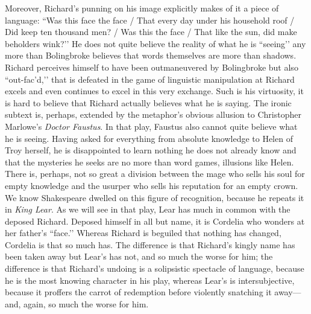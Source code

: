 Moreover, Richard’s punning on his image explicitly makes of it a piece of language: ``Was this face the face / That every day under his household roof / Did keep ten thousand men? / Was this the face / That like the sun, did make beholders wink?’’ He does not quite believe the reality of what he is ``seeing’’ any more than Bolingbroke believes that words themselves are more than shadows.
Richard perceives himself to have been outmaneuvered by Bolingbroke but also ``out-fac’d,’’ that is defeated in the game of linguistic manipulation at Richard excels and even continues to excel in this very exchange.
Such is his virtuosity, it is hard to believe that Richard actually believes what he is saying.
The ironic subtext is, perhaps, extended by the metaphor’s obvious allusion to Christopher Marlowe’s \emph{Doctor Faustus}.
In that play, Faustus also cannot quite believe what he is seeing.
Having asked for everything from absolute knowledge to Helen of Troy herself, he is disappointed to learn nothing he does not already know and that the mysteries he seeks are no more than word games, illusions like Helen.
There is, perhaps, not so great a division between the mage who sells his soul for empty knowledge and the usurper who sells his reputation for an empty crown.
We know Shakespeare dwelled on this figure of recognition, because he repeats it in \emph{King Lear}.
As we will see in that play, Lear has much in common with the deposed Richard.
Deposed himself in all but name, it is Cordelia who wonders at her father’s ``face.’’ Whereas Richard is beguiled that nothing has changed, Cordelia is that so much has.
The difference is that Richard’s kingly name has been taken away but Lear’s has not, and so much the worse for him; the difference is that Richard’s undoing is a solipsistic spectacle of language, because he is the most knowing character in his play, whereas Lear’s is intersubjective, because it proffers the carrot of redemption before violently snatching it away---and, again, so much the worse for him.

